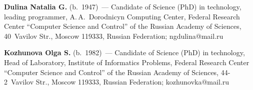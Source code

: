 \vspace*{3pt}


\noindent
\textbf{Dulina Natalia G.} (b.\ 1947)~---
Candidate of Science (PhD) in technology, leading programmer, A.\,A.~Dorodnicyn 
Computing Center, Federal Research Center ``Computer Science and Control'' of 
the Russian Academy of Sciences, 40~Vavilov Str., Moscow 119333, Russian 
Federation; \mbox{ngdulina@mail.ru}
      
\vspace*{3pt}


\noindent
\textbf{Kozhunova Olga S.} (b.\ 1982)~--- Candidate of Science (PhD) in 
technology, Head of Laboratory, Institute of Informatics Problems, Federal 
Research Center ``Computer Science and Control'' of the Russian Academy of 
Sciences, 44-2~Vavilov Str., Moscow 119333, Russian Federation; 
\mbox{kozhunovka@mail.ru}

\label{end\stat}

\renewcommand{\bibname}{\protect\rm Литература}  